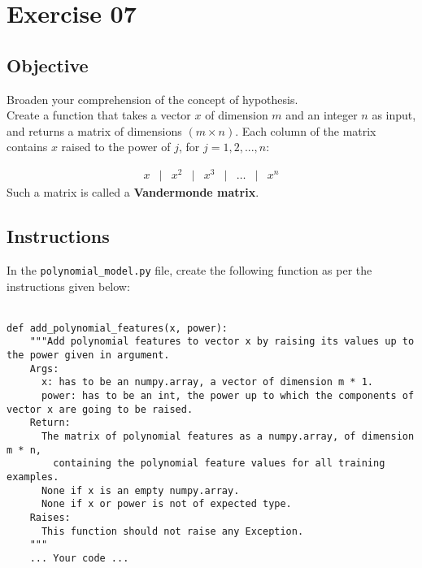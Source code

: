 \chapter{Exercise 07}

\newpage
{}
\makeheaderfilesforbidden


\section*{Objective}
Broaden your comprehension of the concept of hypothesis.\\
\newline
Create a function that takes a vector $x$ of dimension $m$ and an integer $n$ as input, and returns a matrix of dimensions $(m \times n)$.
Each column of the matrix contains $x$ raised to the power of $j$, for $j = 1, 2, ..., n$:

$$
\begin{matrix}
x &|& x^2 &|& x^3 &|& \ldots &|& x^n
\end{matrix}
$$
Such a matrix is called a \textbf{Vandermonde matrix}.

\section*{Instructions}
In the \texttt{polynomial\_model.py} file, create the following function as per the instructions given below:\\
\\
\begin{verbatim}
def add_polynomial_features(x, power):
    """Add polynomial features to vector x by raising its values up to the power given in argument.  
    Args:
      x: has to be an numpy.array, a vector of dimension m * 1.
      power: has to be an int, the power up to which the components of vector x are going to be raised.
    Return:
      The matrix of polynomial features as a numpy.array, of dimension m * n,
        containing the polynomial feature values for all training examples.
      None if x is an empty numpy.array.
      None if x or power is not of expected type.
    Raises:
      This function should not raise any Exception.
    """
    ... Your code ...
\end{verbatim}


